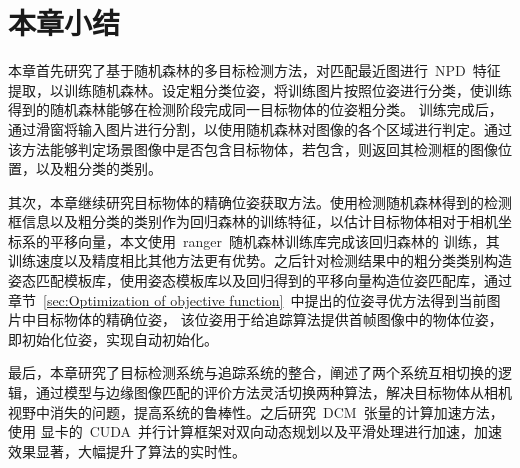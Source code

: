 \section{本章小结}
\label{sec:chap4:summary}
本章首先研究了基于随机森林的多目标检测方法，对匹配最近图进行~NPD~特征提取，以训练随机森林。设定粗分类位姿，将训练图片按照位姿进行分类，使训练得到的随机森林能够在检测阶段完成同一目标物体的位姿粗分类。
训练完成后，通过滑窗将输入图片进行分割，以使用随机森林对图像的各个区域进行判定。通过该方法能够判定场景图像中是否包含目标物体，若包含，则返回其检测框的图像位置，以及粗分类的类别。

其次，本章继续研究目标物体的精确位姿获取方法。使用检测随机森林得到的检测框信息以及粗分类的类别作为回归森林的训练特征，以估计目标物体相对于相机坐标系的平移向量，本文使用~ranger~随机森林训练库完成该回归森林的
训练，其训练速度以及精度相比其他方法更有优势。之后针对检测结果中的粗分类类别构造姿态匹配模板库，使用姿态模板库以及回归得到的平移向量构造位姿匹配库，通过章节~\ref{sec:Optimization of objective function}~中提出的位姿寻优方法得到当前图片中目标物体的精确位姿，
该位姿用于给追踪算法提供首帧图像中的物体位姿，即初始化位姿，实现自动初始化。

最后，本章研究了目标检测系统与追踪系统的整合，阐述了两个系统互相切换的逻辑，通过模型与边缘图像匹配的评价方法灵活切换两种算法，解决目标物体从相机视野中消失的问题，提高系统的鲁棒性。之后研究~DCM~张量的计算加速方法，使用
显卡的~CUDA~并行计算框架对双向动态规划以及平滑处理进行加速，加速效果显著，大幅提升了算法的实时性。

